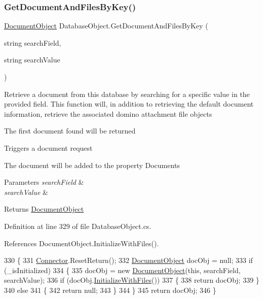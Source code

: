 \subsubsection{\texorpdfstring{Get\+Document\+And\+Files\+By\+Key()}{GetDocumentAndFilesByKey()}}
{\footnotesize\ttfamily \mbox{\hyperlink{class_document_object}{Document\+Object}} Database\+Object.\+Get\+Document\+And\+Files\+By\+Key (\begin{DoxyParamCaption}\item[{string}]{search\+Field,  }\item[{string}]{search\+Value }\end{DoxyParamCaption})}



Retrieve a document from this database by searching for a specific value in the provided field. This function will, in addition to retrieving the default document information, retrieve the associated domino attachment file objects 

The first document found will be returned

Triggers a document request

The document will be added to the property \textquotesingle{}Documents\textquotesingle{}


\begin{DoxyParams}{Parameters}
{\em search\+Field} & \\
\hline
{\em search\+Value} & \\
\hline
\end{DoxyParams}
\begin{DoxyReturn}{Returns}
\mbox{\hyperlink{class_document_object}{Document\+Object}}
\end{DoxyReturn}


Definition at line 329 of file Database\+Object.\+cs.



References Document\+Object.\+Initialize\+With\+Files().


\begin{DoxyCode}
330     \{
331         \mbox{\hyperlink{class_connector}{Connector}}.ResetReturn();
332         \mbox{\hyperlink{class_document_object}{DocumentObject}} docObj = null;
333         \textcolor{keywordflow}{if} (\_isInitialized)
334         \{
335             docObj = \textcolor{keyword}{new} \mbox{\hyperlink{class_document_object}{DocumentObject}}(\textcolor{keyword}{this}, searchField, searchValue);
336             \textcolor{keywordflow}{if} (docObj.\mbox{\hyperlink{class_document_object_a83f0e855adc5fb7afd02d2e34767f5c8}{InitializeWithFiles}}())
337             \{
338                 \textcolor{keywordflow}{return} docObj;
339             \}
340             \textcolor{keywordflow}{else}
341             \{
342                 \textcolor{keywordflow}{return} null;
343             \}
344         \}
345         \textcolor{keywordflow}{return} docObj;
346     \}
\end{DoxyCode}
\mbox{\label{class_database_object_ae5477aedfcd0d54b21017faa1389bc71}} 
